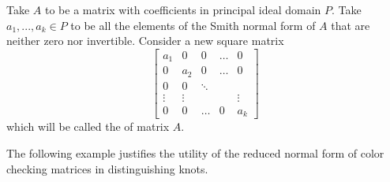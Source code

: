 \begin{definition}
  Take $A$ to be a matrix with coefficients in principal ideal domain $P$. Take $a_1,...,a_k\in P$ to be all the elements of the Smith normal form of $A$ that are neither zero nor invertible. Consider a new square matrix 
  $$
  \begin{bmatrix}
    a_1 & 0 & 0 & \hdots & 0\\ 
    0 & a_2 & 0 & \hdots & 0 \\ 
    0 & 0 & \ddots & &  \\ 
    \vdots & \vdots & & & \vdots \\ 
    0 & 0 & \hdots & 0 & a_k
  \end{bmatrix}
  $$
  which will be called the  of matrix $A$.
\end{definition}

The following example justifies the utility of the reduced normal form of color checking matrices in distinguishing knots.

